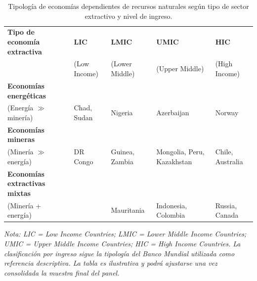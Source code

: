 \documentclass[../../PTFM.tex]{subfiles}
\begin{document}
	\begin{table}[H]
		\centering
		\small
		\caption[Tipología de economías extractivas]{Tipología de economías dependientes de recursos naturales según tipo de sector extractivo y nivel de ingreso.}
		\label{tab:extractive_typology}

		\begin{threeparttable}
				\begin{tabular}{L{3.6cm}L{2.0cm}L{2.3cm}L{2.7cm}L{2.2cm}}
					\toprule
					\textbf{Tipo de economía extractiva} & \textbf{LIC} & \textbf{LMIC} & \textbf{UMIC} & \textbf{HIC} \\
					& (Low Income) & (Lower Middle) & (Upper Middle) & (High Income) \\
					\midrule

					\textbf{Economías energéticas} \\
					(Energía $\gg$ minería)
					& Chad, Sudan
					& Nigeria
					& Azerbaijan
					& Norway \\

					\addlinespace

					\textbf{Economías mineras} \\
					(Minería $\gg$ energía)
					& DR Congo
					& Guinea, Zambia
					& Mongolia, Peru, Kazakhstan
					& Chile, Australia \\

					\addlinespace

					\textbf{Economías extractivas mixtas} \\
					(Minería + energía)
					&
					& Mauritania
					& Indonesia, Colombia
					& Russia, Canada \\

					\bottomrule
				\end{tabular}

			\begin{tablenotes}
				\footnotesize
				\item \textit{Nota: LIC = Low Income Countries; LMIC = Lower Middle Income Countries; UMIC = Upper Middle Income Countries; HIC = High Income Countries. La clasificación por ingreso sigue la tipología del Banco Mundial utilizada como referencia descriptiva. La tabla es ilustrativa y podrá ajustarse una vez consolidada la muestra final del panel.}
			\end{tablenotes}
		\end{threeparttable}
	\end{table}

\end{document}
